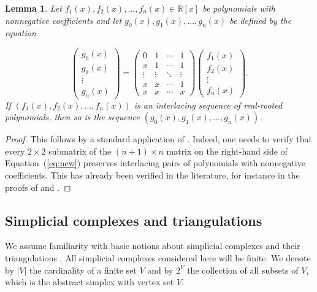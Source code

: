 \documentclass[11pt]{amsart}
\newtheorem{lemma}[theorem]{Lemma}
\newcommand{\RR}{{\mathbb R}}
\begin{document}
\begin{lemma} \label{lem:new}
Let $f_1(x), f_2(x),\dots,f_n(x) \in \RR[x]$ be 
polynomials with nonnegative coefficients and let 
$g_0(x), g_1(x),\dots,g_n(x)$ be defined by the 
equation 

\begin{equation} \label{eq:new} \begin{pmatrix} 
   g_0(x) \\ g_1(x) \\ \vdots \\ g_n(x)
	 \end{pmatrix} = \begin{pmatrix} 
	 0 & 1 & \cdots & 1 \\ 
   x & 1 & \cdots & 1 \\ 
	 \vdots & \vdots & \ddots & \vdots \\ 
	 x & x & \cdots & 1 \\ x & x & \cdots & x
	\end{pmatrix} \begin{pmatrix} 
  f_1(x) \\ f_2(x) \\ \vdots \\ f_n(x) 
	\end{pmatrix}. \end{equation}
%
If $(f_1(x), f_2(x),\dots,f_n(x))$ is an 
interlacing sequence of real-rooted polynomials,
then so is the sequence $(g_0(x), 
g_1(x),\dots,g_n(x))$.
\end{lemma} 

\begin{proof}
This follows by a standard application of 
\cite[Theorem~7.8.5]{Bra15}. Indeed, one needs to 
verify that every $2 \times 2$ submatrix of the 
$(n+1) \times n$ matrix on the right-hand side of
Equation~(\ref{eq:new}) preserves interlacing
pairs of polynomials with nonnegative 
coefficients. This has already been 
verified in the literature, for instance in the
proofs of \cite[Corollary~7.8.7]{Bra15} and 
\cite[Theorem~2.2]{Zh19}.
\end{proof}

\subsection{Simplicial complexes and 
            triangulations} 
\label{subsec:complexes}

We assume familiarity with basic notions about 
simplicial complexes and their triangulations 
\cite{Bj95, MW17, StaCCA}. All simplicial 
complexes considered 
here will be finite. We denote by $|V|$ the
cardinality of a finite set $V$ and by $2^V$ the 
collection of all subsets of $V$, which is the 
abstract simplex with vertex set $V$. 
\end{document}
